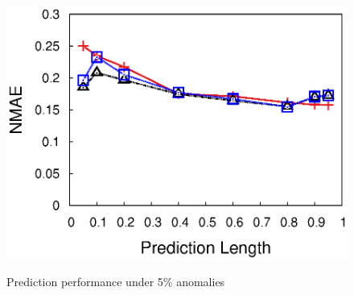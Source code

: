 \begin{figure}[h!]
{{    \includegraphics[width=\figurewidthI]{fig/pred.Prediction.srmf_based_pred.Mob-Recv1run1.dat0_matrix.mat_dB.txt.1000.90.1.1000.r32.period1.org.2d.elem.half.elem1.burst1.na0.05.anom0.4.noise0.thresh0.eps}
  }
  }
  \caption{Prediction performance under 5\% anomalies}
  \label{fig:prediction}
\end{figure}


